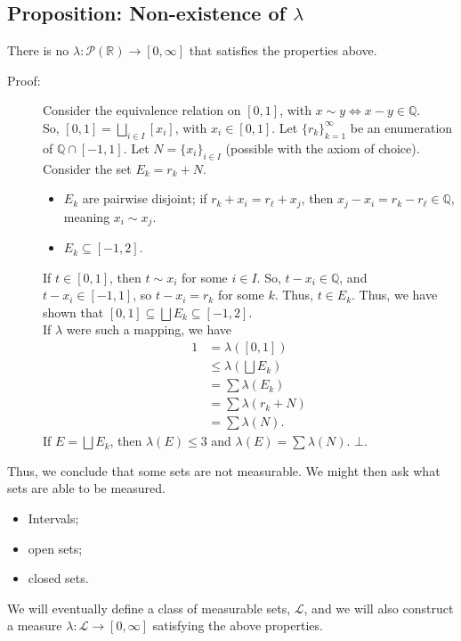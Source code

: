 \documentclass[10pt]{extarticle}
\newcommand{\Q}{\mathbb{Q}}
\newcommand{\R}{\mathbb{R}}
\begin{document}
  \subsection{Proposition: Non-existence of $\lambda$}%
  There is no $\lambda: \mathcal{P}(\R)\rightarrow [0,\infty]$ that satisfies the properties above.
  \begin{description}
    \item[Proof:] Consider the equivalence relation on $[0,1]$, with $x\sim y \Leftrightarrow x-y\in \Q$.\\

      So, $[0,1] = \bigsqcup_{i\in I} [x_i]$, with $x_i\in [0,1]$. Let $\{r_k\}_{k=1}^{\infty}$ be an enumeration of $\Q \cap [-1,1]$. Let $N = \{x_i\}_{i\in I}$ (possible with the axiom of choice).\\

      Consider the set $E_k = r_k + N$.
      \begin{itemize}
        \item $E_k$ are pairwise disjoint; if $r_k + x_i = r_{\ell} + x_j$, then $x_j - x_i = r_k - r_{\ell}\in \Q$, meaning $x_i \sim x_j$.
        \item $E_k \subseteq [-1,2]$.
      \end{itemize}
      If $t\in [0,1]$, then $t\sim x_i$ for some $i\in I$. So, $t-x_i \in \Q$, and $t-x_i\in [-1,1]$, so $t-x_i = r_k$ for some $k$. Thus, $t\in E_k$. Thus, we have shown that $[0,1]\subseteq \bigsqcup E_k\subseteq [-1,2]$.\\

      If $\lambda$ were such a mapping, we have
      \begin{align*}
        1 &= \lambda([0,1])\\
          &\leq \lambda(\bigsqcup E_k)\\
          &= \sum \lambda(E_k)\\
          &= \sum \lambda(r_k + N)\\
          &= \sum \lambda(N).
      \end{align*}
      If $E = \bigsqcup E_k$, then $\lambda(E) \leq 3$ and $\lambda(E) = \sum \lambda(N)$. $\bot$.
  \end{description}
  Thus, we conclude that some sets are not measurable. We might then ask what sets are able to be measured.
  \begin{itemize}
    \item Intervals;
    \item open sets;
    \item closed sets.
  \end{itemize}
  We will eventually define a class of measurable sets, $\mathcal{L}$, and we will also construct a measure $\lambda: \mathcal{L}\rightarrow [0,\infty]$ satisfying the above properties.
\end{document}
